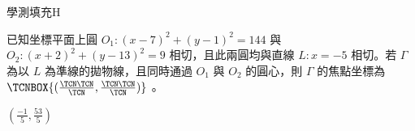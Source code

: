     \begin{QUESTION}
        \begin{ExamInfo}{97}{學測}{填充}{H}
        \end{ExamInfo}
        \begin{ExamAnsRateInfo}{10}{29}{1}{0}
        \end{ExamAnsRateInfo}
        \begin{QBODY}
            已知坐標平面上圓 $O_1 :(x-7)^2 +(y-1)^2 =144$ 與 $O_2 : (x+2)^2 +(y-13)^2 =9$ 相切，且此兩圓均與直線 $L:	x = -5$ 相切。若 $\Gamma$ 為以 $L$ 為準線的拋物線，且同時通過 $O_1$ 與 $O_2$ 的圓心，則 $\Gamma$ 的焦點坐標為 
$\TCNBOX{(\frac{\TCN\TCN}{\TCN},\frac{\TCN\TCN}{\TCN})}$ 。
        \end{QBODY}
        \begin{QFROMS}
        \end{QFROMS}
        \begin{QTAGS}\end{QTAGS}
        \begin{QANS}
            $(\frac{-1}{5},\frac{53}{5})$
        \end{QANS}
        \begin{QSOLLIST}
        \end{QSOLLIST}
        \begin{QEMPTYSPACE}
        \end{QEMPTYSPACE}
    \end{QUESTION}
